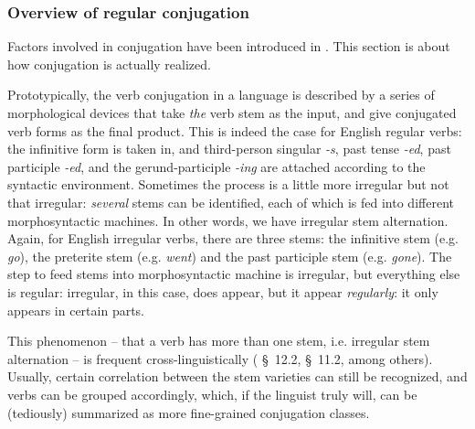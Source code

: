 \documentclass{article}
\newcommand*{\citesec}[1]{\S~{#1}}
\newcommand*{\corpus}[1]{\emph{#1}}
\begin{document}
\subsubsection{Overview of regular conjugation}

Factors involved in conjugation have been introduced in .
This section is about how conjugation is actually realized.

Prototypically, the verb conjugation in a language is described by 
a series of morphological devices that take \emph{the} verb stem as the input,
and give conjugated verb forms as the final product.
This is indeed the case for English regular verbs:
the infinitive form is taken in,
and third-person singular \corpus{-s}, past tense \corpus{-ed}, 
past participle \corpus{-ed}, and the gerund-participle \corpus{-ing}
are attached according to the syntactic environment.
Sometimes the process is a little more irregular but not that irregular:
\emph{several} stems can be identified, each of which is fed into different morphosyntactic machines.
In other words, we have irregular stem alternation.
Again, for English irregular verbs,
there are three stems: the infinitive stem (e.g. \corpus{go}), 
the preterite stem (e.g. \corpus{went})
and the past participle stem (e.g. \corpus{gone}).
The step to feed stems into morphosyntactic machine is irregular,
but everything else is regular:
irregular, in this case, does appear, but it appear \emph{regularly}:
it only appears in certain parts.

This phenomenon -- that a verb has more than one stem, i.e. irregular stem alternation
-- is frequent cross-linguistically
(\citealt{jacques2021grammar} \citesec{12.2}, \citealt{forker2020grammar} \citesec{11.2}, among others).
Usually, certain correlation between the stem varieties can still be recognized,
and verbs can be grouped accordingly,
which, if the linguist truly will, can be (tediously) summarized as more fine-grained conjugation classes.
\end{document}

